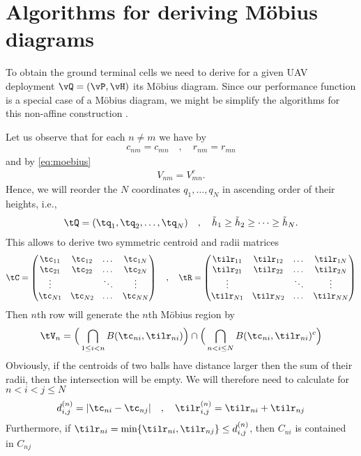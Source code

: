 \section{Algorithms for deriving Möbius diagrams}
%
To obtain the ground terminal cells we need to derive for a given UAV deployment $\vQ=(\vP,\vH)$ its Möbius diagram. 
Since our performance function is a special case of a Möbius diagram, we might be simplify the algorithms for this
non-affine construction \cite{BWY07}.

Let us observe that for each $n\not=m$ we have by 
%
\begin{align}
  c_{nm}=c_{mn} \quad, \quad r_{nm}=r_{mn}
\end{align}
%
and by \eqref{eq:moebius}
%
\begin{align}
  V_{nm}=V_{mn}^c. 
\end{align}
%
Hence, we will reorder the $N$ coordinates $q_1,\dots,q_N$ in ascending order of their heights, i.e.,
%
\begin{align}
  \tQ=(\tq_1,\tq_2,\dots,\tq_N) \quad,\quad \tilde{h}_1\geq \tilde{h}_2\geq \dots\geq \tilde{h}_N.
\end{align}
%
This allows to derive two symmetric centroid and radii matrices
%
\begin{align}
  \tC=\begin{pmatrix}
    \tc_{11} & \tc_{12} & \dots & \tc_{1N}\\ 
    \tc_{21} & \tc_{22} & \dots & \tc_{2N}\\ 
    \vdots   &          & \ddots & \vdots\\
    \tc_{N1} & \tc_{N2} & \dots & \tc_{NN}\\ 
  \end{pmatrix}
  \quad,\quad
  \tR=\begin{pmatrix}
    \tilr_{11} & \tilr_{12} & \dots & \tilr_{1N}\\ 
    \tilr_{21} & \tilr_{22} & \dots & \tilr_{2N}\\ 
    \vdots   &          & \ddots & \vdots\\
    \tilr_{N1} & \tilr_{N2} & \dots & \tilr_{NN}\\ 
  \end{pmatrix}
\end{align}
%
Then $n$th row will generate the $n$th Möbius region by
%
\begin{align}
  \tV_n= \Big( \bigcap_{1\leq i< n}  B(\tc_{ni},\tilr_{ni})\Big) \cap \Big( \bigcap_{n<i\leq N}
  B(\tc_{ni},\tilr_{ni})^c\Big)
\end{align}
%
Obviously, if the centroids of two balls have distance larger then the sum of their radii, then the intersection will be
empty. We will therefore need to calculate  for $n<i<j\leq N$
%
\begin{align}
  d^{(n)}_{i,j}= |\tc_{ni}-\tc_{nj}|\quad,\quad \tilr^{(n)}_{i,j}=\tilr_{ni}+\tilr_{nj} 
\end{align}
%
Furthermore, if $\tilr_{ni}=\min\{\tilr_{ni},\tilr_{nj}\}\leq d^{(n)}_{i,j}$, then $C_{ni}$ is contained in $C_{nj}$ 
